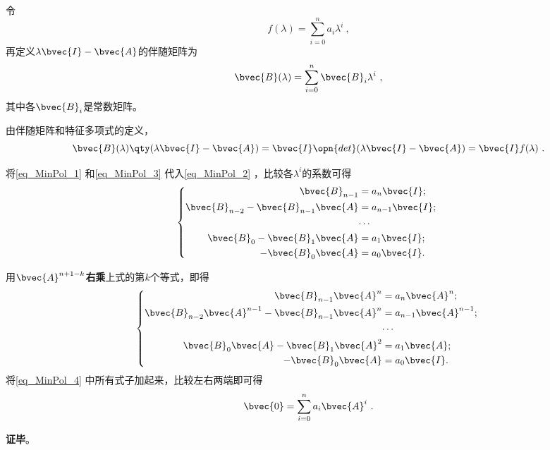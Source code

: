 令
\begin{equation}\label{eq_MinPol_1}
f(\lambda) = \sum_{i=0}^n a_i\lambda^i~, 
\end{equation}
再定义$\lambda\bvec{I}-\bvec{A}$的伴随矩阵为
\begin{equation}\label{eq_MinPol_3}
\bvec{B}(\lambda)=\sum_{i=0}^n \bvec{B}_i\lambda^i~, 
\end{equation}
其中各$\bvec{B}_i$是常数矩阵。

由伴随矩阵和特征多项式的定义，
\begin{equation}\label{eq_MinPol_2}
\bvec{B}(\lambda)\qty(\lambda\bvec{I}-\bvec{A}) = \bvec{I}\opn{det}(\lambda\bvec{I}-\bvec{A}) = \bvec{I}f(\lambda)~. 
\end{equation}

将\autoref{eq_MinPol_1} 和\autoref{eq_MinPol_3} 代入\autoref{eq_MinPol_2} ，比较各$\lambda^i$的系数可得
\begin{equation}
\left\{
\begin{aligned}
\bvec{B}_{n-1} ={}& a_n\bvec{I}; \\
\bvec{B}_{n-2}-\bvec{B}_{n-1}\bvec{A} ={}& a_{n-1}\bvec{I}; \\
\cdots{}&\\
\bvec{B}_{0}-\bvec{B}_{1}\bvec{A} ={}& a_1\bvec{I};\\
-\bvec{B}_{0}\bvec{A} ={}& a_0\bvec{I}. 
\end{aligned}
\right. ~
\end{equation}

用$\bvec{A}^{n+1-k}$\textbf{右乘}上式的第$k$个等式，即得
\begin{equation}\label{eq_MinPol_4}
\left\{
\begin{aligned}
\bvec{B}_{n-1} \bvec{A}^n={}& a_n\bvec{A}^n; \\
\bvec{B}_{n-2}\bvec{A}^{n-1}-\bvec{B}_{n-1}\bvec{A}^n ={}& a_{n-1}\bvec{A}^{n-1}; \\
\cdots{}&\\
\bvec{B}_{0}\bvec{A}-\bvec{B}_{1}\bvec{A}^2 ={}& a_1\bvec{A};\\
-\bvec{B}_{0}\bvec{A} ={}& a_0\bvec{I}. 
\end{aligned}
\right. ~
\end{equation}
将\autoref{eq_MinPol_4} 中所有式子加起来，比较左右两端即可得
\begin{equation}
\bvec{0} = \sum_{i=0}^n a_i\bvec{A}^i~. 
\end{equation}

\textbf{证毕}。



